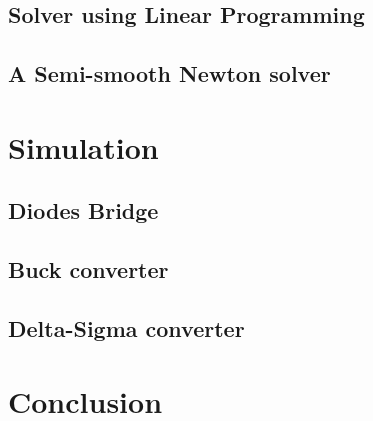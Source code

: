 \documentclass[8pt,xcolor*pst]{beamer}
\begin{document}
\subsection{Solver using Linear Programming}

\subsection{A Semi-smooth Newton solver}

\section{Simulation}
\subsection{Diodes Bridge}

\subsection{Buck converter}

\subsection{Delta-Sigma converter}

\section{Conclusion}



\def\newblock{}
\end{document}
